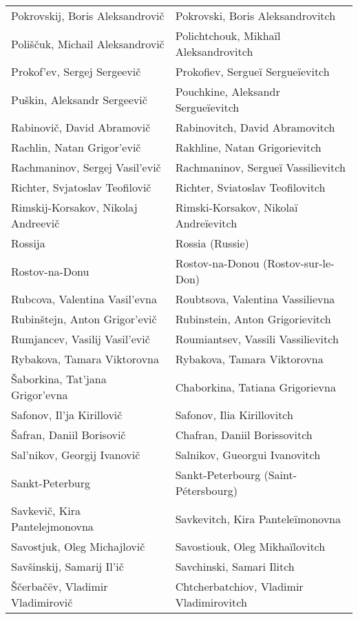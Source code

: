 {\begin{longtable}[c]{ll}
 \\
 Pokrovskij, Boris Aleksandrovič
 & Pokrovski, Boris Aleksandrovitch
 \\
 Poliščuk, Michail Aleksandrovič
 & Polichtchouk, Mikhaïl Aleksandrovitch
 \\
 Prokof'ev, Sergej Sergeevič
 & Prokofiev, Sergueï Sergueïevitch
 \\
 Puškin, Aleksandr Sergeevič
 & Pouchkine, Aleksandr Sergueïevitch
 \\
 Rabinovič, David Abramovič
 & Rabinovitch, David Abramovitch
 \\
 Rachlin, Natan Grigor'evič
 & Rakhline, Natan Grigorievitch
 \\
 Rachmaninov, Sergej Vasil'evič
 & Rachmaninov, Sergueï Vassilievitch
 \\
 Richter, Svjatoslav Teofilovič
 & Richter, Sviatoslav Teofilovitch
 \\
 Rimskij-Korsakov, Nikolaj Andreevič
 & Rimski-Korsakov, Nikolaï Andreïevitch
 \\
 Rossija
 & Rossia (Russie)
 \\
 Rostov-na-Donu
 & Rostov-na-Donou (Rostov-sur-le-Don)
 \\
 Rubcova, Valentina Vasil'evna
 & Roubtsova, Valentina Vassilievna
 \\
 Rubinštejn, Anton Grigor'evič
 & Rubinstein, Anton Grigorievitch
 \\
 Rumjancev, Vasilij Vasil'evič
 & Roumiantsev, Vassili Vassilievitch
 \\
 Rybakova, Tamara Viktorovna
 & Rybakova, Tamara Viktorovna
 \\
 Šaborkina, Tat'jana Grigor'evna
 & Chaborkina, Tatiana Grigorievna
 \\
 Safonov, Il'ja Kirillovič
 & Safonov, Ilia Kirillovitch
 \\
 Šafran, Daniil Borisovič
 & Chafran, Daniil Borissovitch
 \\
 Sal'nikov, Georgij Ivanovič
 & Salnikov, Gueorgui Ivanovitch
 \\
 Sankt-Peterburg
 & Sankt-Peterbourg (Saint-Pétersbourg)
 \\
 Savkevič, Kira Pantelejmonovna
 & Savkevitch, Kira Panteleïmonovna
 \\
 Savostjuk, Oleg Michajlovič
 & Savostiouk, Oleg Mikhaïlovitch
 \\
 Savšinskij, Samarij Il'ič
 & Savchinski, Samari Ilitch
 \\
 Ščerbačëv, Vladimir Vladimirovič
 & Chtcherbatchiov, Vladimir Vladimirovitch
 \\

\end{longtable}}
